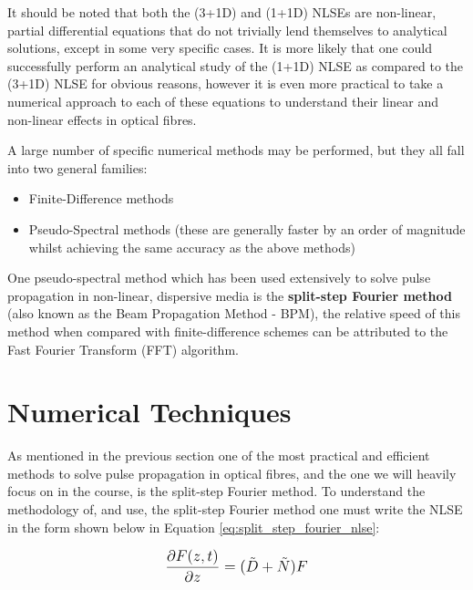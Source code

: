 \documentclass[colorlinks,11pt,a4paper,normalphoto,withhyper,ragged2e]{altareport}
\begin{document}
	\vspace{5mm}
	
	It should be noted that both the (3+1D) and (1+1D) NLSEs are non-linear, partial differential equations that do not trivially lend themselves to analytical solutions, except in some very specific cases. It is more likely that one could successfully perform an analytical study of the (1+1D) NLSE as compared to the (3+1D) NLSE for obvious reasons, however it is even more practical to take a numerical approach to each of these equations to understand their linear and non-linear effects in optical fibres. \linebreak
	
	A large number of specific numerical methods may be performed, but they all fall into two general families: \linebreak
	\begin{itemize}[leftmargin=1cm]
		\item Finite-Difference methods
		\item Pseudo-Spectral methods (these are generally faster by an order of magnitude whilst achieving the same accuracy as the above methods)
	\end{itemize}
	
	\vspace{5mm}
	
	One pseudo-spectral method which has been used extensively to solve pulse propagation in non-linear, dispersive media is the \textbf{split-step Fourier method} (also known as the Beam Propagation Method - BPM), the relative speed of this method when compared with finite-difference schemes can be attributed to the Fast Fourier Transform (FFT) algorithm.
	
	\pagebreak

	
	
	
\section{Numerical Techniques}

	As mentioned in the previous section one of the most practical and efficient methods to solve pulse propagation in optical fibres, and the one we will heavily focus on in the course, is the split-step Fourier method. To understand the methodology of, and use, the split-step Fourier method one must write the NLSE in the form shown below in Equation \ref{eq:split_step_fourier_nlse}:
	
	\begin{equation} \label{eq:split_step_fourier_nlse}
       \mathlarger{ \frac{\partial F(z,t)}{\partial z} = (\tilde{D} + \tilde{N}) F }
	\end{equation}
	
\end{document}
